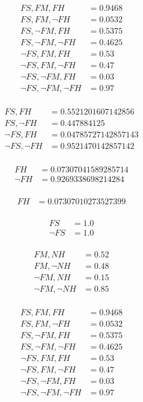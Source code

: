 \documentclass[12pt]{article}
\begin{document}
\begin{align*}
FS, FM, FH &= 0.9468 \\
FS, FM, ¬FH &= 0.0532 \\
FS, ¬FM, FH &= 0.5375 \\
FS, ¬FM, ¬FH &= 0.4625 \\
¬FS, FM, FH &= 0.53 \\
¬FS, FM, ¬FH &= 0.47 \\
¬FS, ¬FM, FH &= 0.03 \\
¬FS, ¬FM, ¬FH &= 0.97 \\
\end{align*}

\begin{align*}
FS, FH &= 0.5521201607142856 \\
FS, ¬FH &= 0.447884125 \\
¬FS, FH &= 0.04785727142857143 \\
¬FS, ¬FH &= 0.9521470142857142 \\
\end{align*}

\begin{align*}
FH &= 0.07307041589285714 \\
¬FH &= 0.9269338698214284 \\
\end{align*}

\begin{align*}
FH &= 0.07307010273527399 \\
\end{align*}



\problemsub
\begin{align*}
FS &= 1.0 \\
¬FS &= 1.0 \\
\end{align*}

\begin{align*}
FM, NH &= 0.52 \\
FM, ¬NH &= 0.48 \\
¬FM, NH &= 0.15 \\
¬FM, ¬NH &= 0.85 \\
\end{align*}

\begin{align*}
FS, FM, FH &= 0.9468 \\
FS, FM, ¬FH &= 0.0532 \\
FS, ¬FM, FH &= 0.5375 \\
FS, ¬FM, ¬FH &= 0.4625 \\
¬FS, FM, FH &= 0.53 \\
¬FS, FM, ¬FH &= 0.47 \\
¬FS, ¬FM, FH &= 0.03 \\
¬FS, ¬FM, ¬FH &= 0.97 \\
\end{align*}
\end{document}
